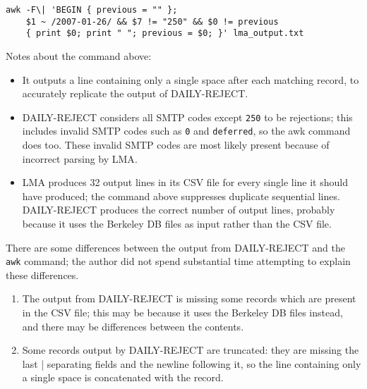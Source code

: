 
\begin{verbatim}
awk -F\| 'BEGIN { previous = "" };
    $1 ~ /2007-01-26/ && $7 != "250" && $0 != previous 
    { print $0; print " "; previous = $0; }' lma_output.txt
\end{verbatim}

Notes about the command above:

\begin{itemize}

    \item It outputs a line containing only a single space after each
        matching record, to accurately replicate the output of
        DAILY-REJECT\@.

    \item DAILY-REJECT considers all \gls{SMTP} codes except \texttt{250}
        to be rejections; this includes invalid \gls{SMTP} codes such as
        \texttt{0} and \texttt{deferred}, so the awk command does too.
        These invalid \gls{SMTP} codes are most likely present because of
        incorrect parsing by \gls{LMA}.

    \item \gls{LMA} produces 32 output lines in its \gls{CSV} file for
        every single line it should have produced; the command above
        suppresses duplicate sequential lines.  DAILY-REJECT produces the
        correct number of output lines, probably because it uses the
        Berkeley DB files as input rather than the \gls{CSV} file.

\end{itemize}

There are some differences between the output from DAILY-REJECT and the
\texttt{awk} command; the author did not spend substantial time attempting
to explain these differences.

\begin{enumerate}

    \item The output from DAILY-REJECT is missing some records which are
        present in the \gls{CSV} file; this may be because it uses the
        Berkeley DB files instead, and there may be differences between the
        contents.

    \item Some records output by DAILY-REJECT are truncated: they are
        missing the last | separating fields and the newline following it,
        so the line containing only a single space is concatenated with the
        record.

\end{enumerate}

